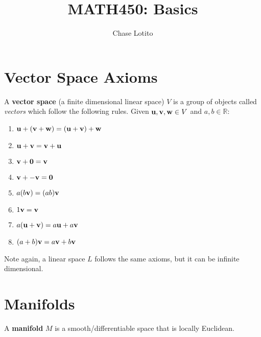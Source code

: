 \documentclass{article}
\title{MATH450: Basics}
\author{Chase Lotito}
\date{}
\begin{document}
\maketitle

\section*{Vector Space Axioms}

A \textbf{vector space} (a finite dimensional linear space) \(V\) is a group of objects called \textit{vectors} which follow the following rules. Given \(\vb{u}, \vb{v}, \vb{w} \in V\) and \(a,b \in \mathbb{R}\):

\begin{enumerate}
    \item \( \vb{u} + ( \vb{v} + \vb{w} ) = ( \vb{u} + \vb{v} ) + \vb{w} \)
    \item \( \vb{u} + \vb{v} = \vb{v} + \vb{u} \)
    \item \( \vb{v} + \vb{0} = \vb{v} \)
    \item \( \vb{v} + - \vb{v} = \vb{0} \)
    \item \( a(b\vb{v}) = (ab) \vb{v}  \)
    \item \( 1 \vb{v} = \vb{v}  \)
    \item \( a (\vb{u} + \vb{v}) = a\vb{u} +a\vb{v} \)
    \item \( (a + b) \vb{v} = a\vb{v} + b\vb{v} \)
\end{enumerate}

Note again, a linear space \(L\) follows the same axioms, but it can be infinite dimensional.

\section*{Manifolds}

A \textbf{manifold} \(M\) is a smooth/differentiable space that is locally Euclidean.
\end{document}
